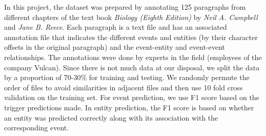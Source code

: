In this project, the dataset was prepared by annotating 125 paragraphs from different chapters of the text book {\em Biology (Eighth Edition)} by {\em Neil A. Campbell} and {\em Jane B. Reece}. Each paragraph is a text file and has an associated annotation file that indicates the different events and entities (by their character offsets in the original paragraph) and the event-entity and event-event relationships. The annotations were done by experts in the field (employees of the company Vulcan). Since there is not much data at our disposal, we split the data by a proportion of 70-30\% for training and testing. We randomly permute the order of files to avoid similarities in adjacent files and then use 10 fold cross validation on the training set. For event prediction, we use F1 score based on the trigger predictions made. In entity prediction, the F1 score is based on whether an entity was predicted correctly along with its association with the corresponding event.